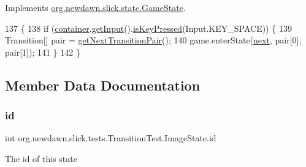 Implements \mbox{\hyperlink{interfaceorg_1_1newdawn_1_1slick_1_1state_1_1_game_state_ab5ec3bc37a9bd1eb5679577408c562c1}{org.\+newdawn.\+slick.\+state.\+Game\+State}}.


\begin{DoxyCode}
137                                                                                                           \{
138             \textcolor{keywordflow}{if} (\mbox{\hyperlink{classorg_1_1newdawn_1_1slick_1_1state_1_1_state_based_game_a538846600436175cbed48450adfdd025}{container}}.\mbox{\hyperlink{classorg_1_1newdawn_1_1slick_1_1_game_container_a6042fd06c54872f9f791bd33beffec88}{getInput}}().\mbox{\hyperlink{classorg_1_1newdawn_1_1slick_1_1_input_a235ecf083734d727c4de50441b082649}{isKeyPressed}}(Input.KEY\_SPACE)) \{
139                 Transition[] pair = \mbox{\hyperlink{classorg_1_1newdawn_1_1slick_1_1tests_1_1_transition_test_a58d5d7172cabffd0d18457cbf8a90e6b}{getNextTransitionPair}}();
140                 game.enterState(\mbox{\hyperlink{classorg_1_1newdawn_1_1slick_1_1tests_1_1_transition_test_1_1_image_state_a91322399fc4bdbdba33cfe81524adb59}{next}}, pair[0], pair[1]);
141             \}
142         \}
\end{DoxyCode}


\subsection{Member Data Documentation}
\mbox{\label{classorg_1_1newdawn_1_1slick_1_1tests_1_1_transition_test_1_1_image_state_a4160846ad41a9f74b96e40e7f4a15237}} 
\subsubsection{\texorpdfstring{id}{id}}
{\footnotesize\ttfamily int org.\+newdawn.\+slick.\+tests.\+Transition\+Test.\+Image\+State.\+id\hspace{0.3cm}{\ttfamily [private]}}

The id of this state \mbox{\label{classorg_1_1newdawn_1_1slick_1_1tests_1_1_transition_test_1_1_image_state_a930e1e326fbc77f8b9c47f6c04718744}} 
